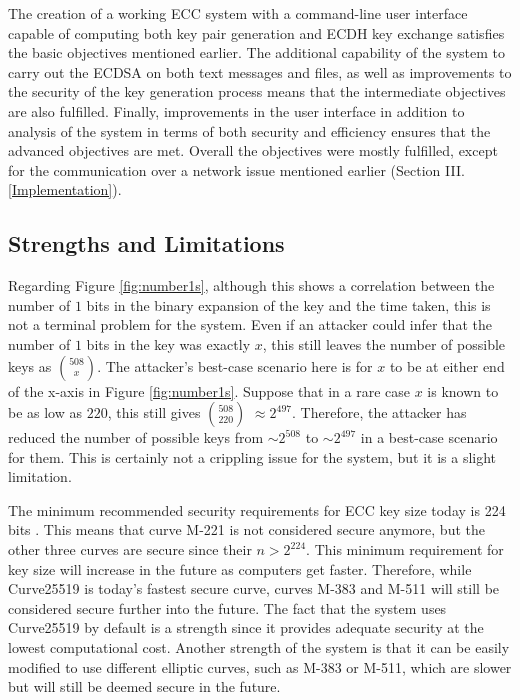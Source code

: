 \documentclass[12pt,a4paper]{article}
\begin{document}
The creation of a working ECC system with a command-line user interface capable of computing both key pair generation and ECDH key exchange satisfies the basic objectives mentioned earlier. 
The additional capability of the system to carry out the ECDSA on both text messages and files, 
as well as improvements to the security of the key generation process means that the intermediate objectives are also fulfilled. 
Finally, improvements in the user interface in addition to analysis of the system in terms of both security and efficiency ensures that the advanced objectives are met. 
Overall the objectives were mostly fulfilled, except for the communication over a network issue mentioned earlier (Section III.\ref{Implementation}). 


\subsection{Strengths and Limitations} \noindent \label{Strengths}
Regarding Figure \ref{fig:number1s}, although this shows a correlation between the number of $1$ bits in the binary expansion of the key 
and the time taken, this is not a terminal problem for the system. 
Even if an attacker could infer that the number of $1$ bits in the key was exactly $x$, 
this still leaves the number of possible keys as $508 \choose x$. 
The attacker's best-case scenario here is for $x$ to be at either end of the x-axis in Figure \ref{fig:number1s}. 
Suppose that in a rare case $x$ is known to be as low as $220$, this still gives $508 \choose 220$ $\approx 2^{497}$. 
Therefore, the attacker has reduced the number of possible keys from $\sim 2^{508}$ to $\sim 2^{497}$ in a best-case scenario for them. 
This is certainly not a crippling issue for the system, but it is a slight limitation. 

The minimum recommended security requirements for ECC key size today is 224 bits \cite[p54-55]{barker2020recommendation}. 
This means that curve M-221 is not considered secure anymore, but the other three curves are secure since their $n > 2^{224}$. 
This minimum requirement for key size will increase in the future as computers get faster. 
Therefore, while Curve25519 is today's fastest secure curve, 
curves M-383 and M-511 will still be considered secure further into the future. 
The fact that the system uses Curve25519 by default is a strength since it provides adequate security at the lowest computational cost. 
Another strength of the system is that it can be easily modified to use different elliptic curves, such as M-383 or M-511, which are slower but will still be deemed secure in the future. 
\end{document}
